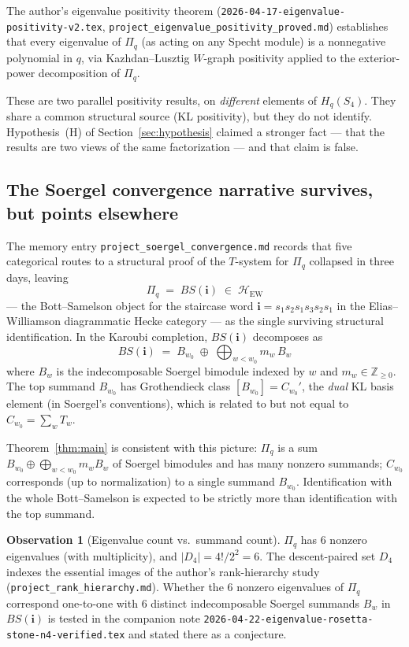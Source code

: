 \documentclass[11pt]{article}
\theoremstyle{definition}
\newtheorem{observation}[theorem]{Observation}
\begin{document}
The author's eigenvalue positivity theorem
(\texttt{2026-04-17-eigenvalue-positivity-v2.tex},
\texttt{project\_eigenvalue\_positivity\_proved.md}) establishes that every
eigenvalue of $\Pi_q$ (as acting on any Specht module) is a nonnegative
polynomial in $q$, via Kazhdan--Lusztig $W$-graph positivity applied to the
exterior-power decomposition of $\Pi_q$.

These are two parallel positivity results, on \emph{different} elements of
$H_q(S_4)$. They share a common structural source (KL positivity), but they
do not identify. Hypothesis~(H) of Section~\ref{sec:hypothesis} claimed a
stronger fact --- that the results are two views of the same factorization
--- and that claim is false.

\subsection{The Soergel convergence narrative survives, but points elsewhere}

The memory entry \texttt{project\_soergel\_convergence.md} records that
five categorical routes to a structural proof of the $T$-system for
$\Pi_q$ collapsed in three days, leaving
\[
\Pi_q \;=\; BS(\mathbf{i}) \;\in\; \mathcal{H}_{\mathrm{EW}}
\]
--- the Bott--Samelson object for the staircase word $\mathbf{i} = s_1 s_2
s_1 s_3 s_2 s_1$ in the Elias--Williamson diagrammatic Hecke category ---
as the single surviving structural identification. In the Karoubi
completion, $BS(\mathbf{i})$ decomposes as
\[
BS(\mathbf{i}) \;=\; B_{w_0} \;\oplus\; \bigoplus_{w < w_0} m_w\, B_w
\]
where $B_w$ is the indecomposable Soergel bimodule indexed by $w$ and
$m_w \in \mathbb{Z}_{\geq 0}$. The top summand $B_{w_0}$ has Grothendieck
class $[B_{w_0}] = C_{w_0}'$, the \emph{dual} KL basis element (in
Soergel's conventions), which is related to but not equal to
$C_{w_0} = \sum_w T_w$.

Theorem~\ref{thm:main} is consistent with this picture: $\Pi_q$ is a sum
$B_{w_0} \oplus \bigoplus_{w<w_0} m_w B_w$ of Soergel bimodules and has
many nonzero summands; $C_{w_0}$ corresponds (up to normalization) to a
single summand $B_{w_0}$. Identification with the whole Bott--Samelson is
expected to be strictly more than identification with the top summand.

\begin{observation}[Eigenvalue count vs.\ summand count]\label{obs:six}
$\Pi_q$ has $6$ nonzero eigenvalues (with multiplicity), and
$|D_4| = 4!/2^2 = 6$. The descent-paired set $D_4$ indexes the essential
images of the author's rank-hierarchy study
(\texttt{project\_rank\_hierarchy.md}). Whether the $6$ nonzero
eigenvalues of $\Pi_q$ correspond one-to-one with $6$ distinct
indecomposable Soergel summands $B_w$ in $BS(\mathbf{i})$ is tested in
the companion note \texttt{2026-04-22-eigenvalue-rosetta-stone-n4-verified.tex}
and stated there as a conjecture.
\end{observation}
\end{document}
